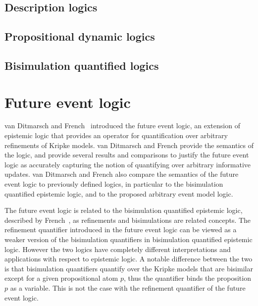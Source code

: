 \subsection{Description logics}

\subsection{Propositional dynamic logics}

\subsection{Bisimulation quantified logics}

\section{Future event logic}

van Ditmarsch and French~\cite{french2009simulation} introduced the future event
logic, an extension of epistemic logic that provides an operator for
quantification over arbitrary refinements of Kripke models. van Ditmarsch and
French provide the semantics of the logic, and provide several results and
comparisons to justify the future event logic as accurately capturing the notion
of quantifying over arbitrary informative updates. van Ditmarsch and French also 
compare the semantics of the future event logic to previously defined logics, in
particular to the bisimulation quantified epistemic logic, and to the proposed
arbitrary event model logic.

The future event logic is related to the bisimulation quantified epistemic
logic, described by French~\cite{french2006bisimulation}, as refinements and
bisimulations are related concepts. The refinement quantifier introduced in the
future event logic can be viewed as a weaker version of the bisimulation
quantifiers in bisimulation quantified epistemic logic. However the two logics
have completely different interpretations and applications with respect to
epistemic logic. A notable difference between the two is that bisimulation
quantifiers quantify over the Kripke models that are bisimilar except for a
given propositional atom $p$, thus the quantifier binds the proposition $p$ as a
variable. This is not the case with the refinement quantifier of the future
event logic. %

